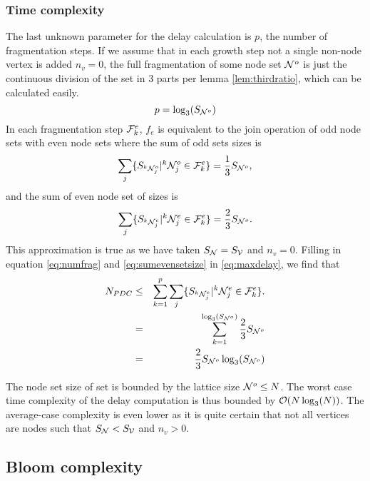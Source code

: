 \subsubsection{Time complexity}
The last unknown parameter for the delay calculation is $p$, the number of fragmentation steps. If we assume that in each growth step not a single non-node vertex is added $n_v = 0$, the full fragmentation of some node set $\mathcal{N}^o$ is just the continuous division of the set in 3 parts per lemma \ref{lem:thirdratio}, which can be calculated easily.
\begin{equation}\label{eq:numfrag}
  p = \log_3(S_{\mathcal{N}^o})
\end{equation}
In each fragmentation step $\mathcal{F}^e_k$, $f_e$ is equivalent to the join operation of odd node sets with even node sets where the sum of odd sets sizes is
\begin{equation}\label{eq:sumoddsetsize}
  \sum_j \{ S_{{}^{k}\mathcal{N}_j^o} | {}^{k}\mathcal{N}_j^o \in \mathcal{F}^e_k \} = \frac{1}{3}S_{\mathcal{N}^o},
\end{equation}
and the sum of even node set of sizes is
\begin{equation}\label{eq:sumevensetsize}
  \sum_j \{ S_{{}^{k}\mathcal{N}_j^e} | {}^{k}\mathcal{N}_j^e \in \mathcal{F}^e_k \} = \frac{2}{3}S_{\mathcal{N}^o}.
\end{equation}
This approximation is true as we have taken $S_{\mathcal{N}} = S_{\mathcal{V}}$ and $n_v=0$. Filling in equation \eqref{eq:numfrag} and \eqref{eq:sumevensetsize} in \eqref{eq:maxdelay}, we find that
\begin{eqnarray}
\nonumber  N_{PDC} &\leq& \sum_{k=1}^{p} \sum_j \{ S_{{}^{k}\mathcal{N}_j^e} | {}^{k}\mathcal{N}_j^e \in \mathcal{F}^e_k \}. \\
\nonumber   &=& \sum_{k=1}^{\log_3(S_{\mathcal{N}^o})} \frac{2}{3}S_{\mathcal{N}^o} \\
   &=& \frac{2}{3}S_{\mathcal{N}^o}\log_3(S_{\mathcal{N}^o})
\end{eqnarray}

The node set size of set is bounded by the lattice size $\mathcal{N}^o \leq N$. The worst case time complexity of the delay computation is thus bounded by $\mathcal{O}(N\log_3(N))$. The average-case complexity is even lower as it is quite certain that not all vertices are nodes such that $S_{\mathcal{N}} < S_{\mathcal{V}}$ and $n_v > 0$.

\subsection{Bloom complexity}

